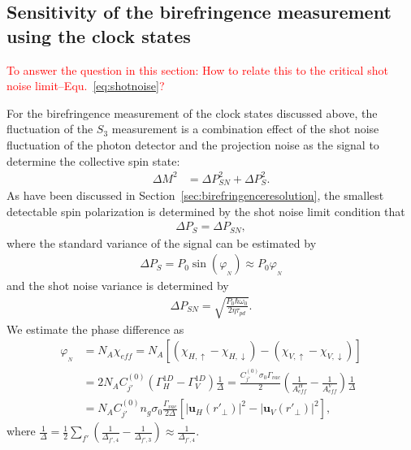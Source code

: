\documentclass[]{report}
\begin{document}
\subsection{Sensitivity of the birefringence measurement using the clock states}
\textcolor{red}{To answer the question in this section: How to relate this to the critical shot noise limit--Equ.~\eqref{eq:shotnoise}?}  

For the birefringence measurement of the clock states discussed above, the fluctuation of the $ S_3 $ measurement is a combination effect of the shot noise fluctuation of the photon detector and the projection noise as the signal to determine the collective spin state:
\begin{align}
\Delta M^2 &= \Delta P^2_{SN} + \Delta P^2_S .
\end{align}
As have been discussed in Section~\ref{sec:birefringenceresolution}, the smallest detectable spin polarization is determined by the shot noise limit condition that 
\begin{align}
\Delta P_S = \Delta P_{SN},
\end{align}
where the standard variance of the signal can be estimated by
\begin{align}
\Delta P_S=P_0 \sin(\varphi_{_N}) \approx P_0 \varphi_{_N}
\end{align}
and the shot noise variance is determined by
\begin{align}
\Delta P_{SN} = \sqrt{\frac{P_0 \hbar \omega_0 }{2\eta \tau_{pd}}}.
\end{align}
We estimate the phase difference as
\begin{align}
\varphi_{_N} &= N_A \chi_{e\!f\!f}=N_A [(\chi_{H,\uparrow}-\chi_{H,\downarrow})-(\chi_{V,\uparrow}-\chi_{V,\downarrow})]\\
&= 2N_AC_{j'}^{(0)}(\Gamma_{H}^{1D}-\Gamma_V^{1D})\frac{1}{\Delta}=\frac{C_{j'}^{(0)}\sigma_0\Gamma_{vac}}{2}(\frac{1}{A^H_{e\!f\!f}}-\frac{1}{A^V_{e\!f\!f}})\frac{1}{\Delta}\\
&=N_AC_{j'}^{(0)}n_g\sigma_0\frac{\Gamma_{vac}}{2\Delta}\left[| \mathbf{u}_H(r'_{\!\perp})|^2- | \mathbf{u}_V(r'_{\!\perp})|^2 \right],
\end{align}
where $\frac{1}{\Delta}=\frac{1}{2}\sum_{f'}(\frac{1}{\Delta_{f',4}}-\frac{1}{\Delta_{f',3}})\approx \frac{1}{\Delta_{f',4}}$.
\end{document}
